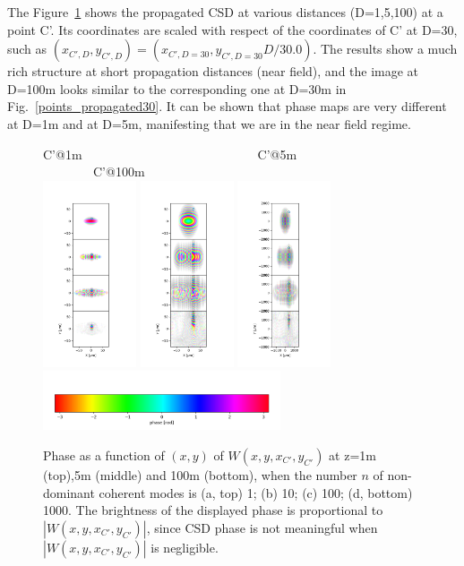 \documentclass{iucr}              %
\begin{document}
The Figure~\ref{pointC_propagated} shows the propagated CSD at various distances (D=1,5,100) at a point C'. Its coordinates are scaled with respect of the coordinates of C' at D=30, such as $(x_{C',D},y_{C',D})=(x_{C',D=30},y_{C',D=30} D / 30.0)$. The results show a much rich structure at short propagation distances (near field), and the image at D=100m looks similar to the corresponding one at D=30m in Fig.~\ref{points_propagated30}. It can be shown that phase maps are very different at D=1m and at D=5m, manifesting that we are in the near field regime.   


\begin{figure}
\caption{Phase as a function of $(x,y)$ of $W(x,y,x_{C'},y_{C'})$ at z=1m (top),5m (middle) and 100m (bottom), when the number $n$ of non-dominant coherent modes is (a, top) 1; (b) 10; (c) 100; (d, bottom) 1000. The brightness of the displayed phase is proportional to $|W(x,y,x_{C'},y_{C'})|$, since CSD phase is not meaningful when $|W(x,y,x_{C'},y_{C'})|$ is negligible.}
C'@1m~~~~~~~~~~~~~~~~~~~~~~~~~~~~C'@5m~~~~~~~~~~~~~~~~~~~~~~~~~~~~C'@100m\\
\includegraphics[width=2.75cm]{Figures/vx_id16a_C1_propagated.png}
\includegraphics[width=2.75cm]{Figures/vx_id16a_C5_propagated.png}
\includegraphics[width=2.75cm]{Figures/vx_id16a_C100_propagated.png}
\includegraphics[width=7cm]{Figures/color_bar.png}
\label{pointC_propagated}
\end{figure}
\end{document}
